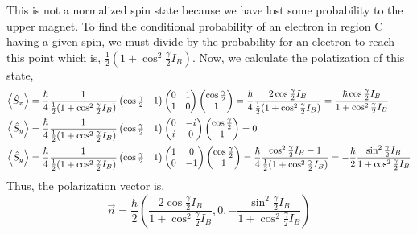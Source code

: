 \documentclass[12pt]{extarticle}
\begin{document}
This is not a normalized spin state because we have lost some probability to the upper magnet. To find the conditional probability of an electron in region C having a given spin, we must divide by the probability for an electron to reach this point which is, $\frac{1}{2}(1 + \cos^2{\tfrac{\gamma}{2}I_B})$.     
Now, we calculate the polatization of this state,
\begin{align*}
\left< \S_x \right> & = \frac{\hbar}{4} \frac{1}{\frac{1}{2}(1 + \cos^2{\tfrac{\gamma}{2}I_B})}
\begin{pmatrix}
\cos{\tfrac{\gamma}{2}} & 1
\end{pmatrix} 
\begin{pmatrix}
0 & 1 \\
1 & 0
\end{pmatrix} 
\begin{pmatrix}
\cos{\tfrac{\gamma}{2}} \\
1
\end{pmatrix} 
= \frac{\hbar}{4} \frac{2 \cos{\tfrac{\gamma}{2} I_B}}{\frac{1}{2}(1 + \cos^2{\tfrac{\gamma}{2}I_B})} = \frac{\hbar \cos{\tfrac{\gamma}{2} I_B}}{1 + \cos^2{\tfrac{\gamma}{2}I_B}} \\
\left< \S_y \right> & = \frac{\hbar}{4} \frac{1}{\frac{1}{2}(1 + \cos^2{\tfrac{\gamma}{2}I_B})}
\begin{pmatrix}
\cos{\tfrac{\gamma}{2}} & 1
\end{pmatrix} 
\begin{pmatrix}
0 & -i \\
i & 0
\end{pmatrix} 
\begin{pmatrix}
\cos{\tfrac{\gamma}{2}} \\
1
\end{pmatrix} 
= 0 \\
\left< \S_y \right> & = \frac{\hbar}{4} \frac{1}{\frac{1}{2}(1 + \cos^2{\tfrac{\gamma}{2}I_B})}
\begin{pmatrix}
\cos{\tfrac{\gamma}{2}} & 1
\end{pmatrix} 
\begin{pmatrix}
1 & 0 \\
0 & -1
\end{pmatrix} 
\begin{pmatrix}
\cos{\tfrac{\gamma}{2}} \\
1
\end{pmatrix} 
= \frac{\hbar}{4} \frac{\cos^2{\tfrac{\gamma}{2} I_B} - 1}{\frac{1}{2}(1 + \cos^2{\tfrac{\gamma}{2}I_B})} = - \frac{\hbar}{2} \frac{\sin^2{\tfrac{\gamma}{2} I_B}}{1 + \cos^2{\tfrac{\gamma}{2}I_B}}
\end{align*}
Thus, the polarization vector is, 
\[\vec{n} = \frac{\hbar}{2} \left(\frac{2 \cos{\tfrac{\gamma}{2} I_B}}{1 + \cos^2{\tfrac{\gamma}{2}I_B}}, 0, -\frac{\sin^2{\tfrac{\gamma}{2} I_B}}{1 + \cos^2{\tfrac{\gamma}{2}I_B}} \right)\]
\end{document}
